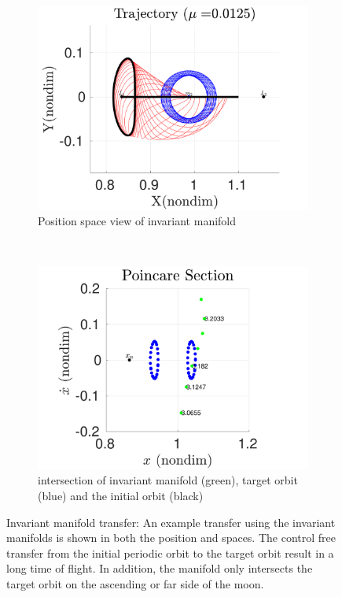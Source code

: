 \begin{figure} 
        \centering 
        \begin{subfigure}[htbp]{0.5\textwidth} 
            \includegraphics[width=\textwidth]{figures/2017_JAS/manifold_trajectory} 
                \caption{Position space view of invariant manifold} \label{fig:manifold_trajectory} 
        \end{subfigure}~%
        \begin{subfigure}[htbp]{0.5\textwidth} 
            \includegraphics[width=\textwidth]{figures/2017_JAS/manifold_poincare} 
                \caption{\Poincare intersection of invariant manifold (green), target orbit (blue) and the initial orbit (black)} \label{fig:manifold_poincare} 
        \end{subfigure} 
        \caption{Invariant manifold transfer: An example transfer using the invariant manifolds is shown in both the position and \Poincare spaces.
        The control free transfer from the initial periodic orbit to the target orbit result in a long time of flight. 
    In addition, the manifold only intersects the target orbit on the ascending or far side of the moon.}
        \label{fig:invariant_manifold_transfer} 
\end{figure}

